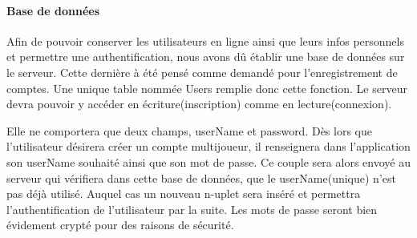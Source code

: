 	\paragraph{Base de données\\}
		Afin de pouvoir conserver les utilisateurs en ligne ainsi que leurs infos
		personnels et permettre une authentification, nous avons dû établir une
		base de données sur le serveur. Cette dernière à été pensé comme demandé pour 
		l'enregistrement de comptes. Une unique table nommée Users remplie donc cette
		fonction. Le serveur devra pouvoir y accéder en écriture(inscription) comme
		en lecture(connexion).
			
		Elle ne comportera que deux champs, userName et password. Dès lors que
		l'utilisateur désirera créer un compte multijoueur, il renseignera dans
		l'application son userName souhaité ainsi que son mot de passe. 
		Ce couple sera 	alors envoyé au serveur qui vérifiera dans cette base de
		données, que le userName(unique) n'est pas déjà utilisé. Auquel cas un nouveau n-uplet sera
		inséré et permettra l'authentification de l'utilisateur par la suite. Les mots
		de passe seront bien évidement crypté pour des raisons de sécurité.
			
		
		
		\newpage
		
	